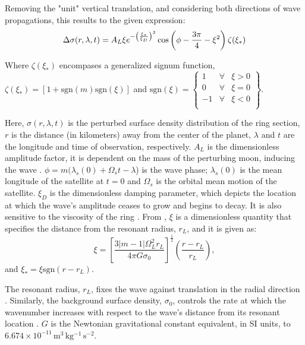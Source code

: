 \documentclass{article}
\begin{document}
Removing the "unit" vertical translation, and considering both directions of wave propagations, this results to the given expression: 
\begin{equation}
   \Delta \sigma(r,\lambda,t) = A_{L}\xi\\e^{-\left(\frac{\xi_{*}}{\xi_{D}}\right)^3}\cos\left(\phi-\frac{3\pi}{4}-\xi^2\right)\zeta(\xi_{*})
\end{equation}

Where $\zeta(\xi_{*})$ encompases a generalized signum function, $\zeta(\xi_{*}) = [1 + \mathrm{sgn}(m)\mathrm{sgn}(\xi)]$  and $ \mathrm{sgn}(\xi) = \left\{ \begin{array}{rcl}
1 & \forall
& \xi>0 \\ 0 & \forall & \xi=0 \\ -1 & \forall & \xi<0 \\
\end{array}\right\}$.

\vspace{3pt}

Here, $\sigma(r,\lambda,t)$ is the perturbed surface density distribution of the ring section, $r$ is the distance (in kilometers) away from the center of the planet, $\lambda$ and $t$ are the longitude and time of observation, respectively. $A_{L}$ is the dimensionless amplitude factor, it is dependent on the mass of the perturbing moon, inducing the wave \cite{Tiscareno_2007}. $\phi = m(\lambda_{s}(0)+\Omega_{s}t-\lambda$) is the wave phase; $\lambda_{s}(0)$ is the mean longitude of the satellite at $t=0$ and $\Omega_{s}$ is the orbital mean motion of the satellite. $\xi_{D}$ is the dimensionless damping parameter, which depicts the location at which the wave's amplitude ceases to grow and begins to decay. It is also sensitive to the viscosity of the ring \cite{Tiscareno_2007}.
From \cite{Nicholson1990AnAR} \cite{1984prin.conf..513S}, $\xi$ is a dimensionless quantity that specifies the distance from the resonant radius, $r_{L}$, and it is given as:
\begin{equation}
\xi = \left[\frac{3|m-1|\Omega_{L}^{2}r_{L}}{4\pi G \sigma_{0}}\right]^{\frac{1}{2}}\left(\frac{r-r_{L}}{r_{L}}\right), 
\end{equation}
and $\xi_{*} = \xi \mathrm{sgn}(r - r_{L})$.

\vspace{3pt}

The resonant radius, $r_{L}$, fixes the wave against translation in the radial direction \cite{Tiscareno_2007}. Similarly, the background surface density, $\sigma_{0}$, controls the rate at which the wavenumber increases with respect to the wave's distance from its resonant location \cite{Tiscareno_2007}. $G$ is the Newtonian gravitational constant equivalent, in SI units, to $6.674 \times 10^{-11} \, \mathrm{m^3 \, kg^{-1} \, s^{-2}}$.
\end{document}
